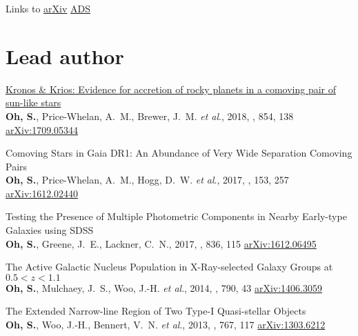 \documentclass[11pt,letterpaper]{article}
\newcommand*\arxiv[1]{\href{https://arxiv.org/abs/#1}{\small arXiv:#1}}
\newcommand{\etal}{\textit{et al}.}
\newcommand{\pubtitle}[1]{#1}
\newcommand{\doi}[2]{\pubtitle{\href{http://dx.doi.org/#1}{{#2}}}}
\newcommand{\submitted}[1]{submitted to #1}
\begin{document}
\noindent
Links to \href{https://arxiv.org/find/all/1/all:+AND+semyeong+oh/0/1/0/all/0/1}{arXiv}
\href{https://ui.adsabs.harvard.edu/public-libraries/Slk-d10nSAe9qtCnvfJd8w}{ADS}

\section*{\small Lead author}

\begin{etaremune}


  \item
    \doi{10.3847/1538-4357/aaab4d}{
      Kronos \& Krios: Evidence for accretion of rocky planets in a comoving pair of sun-like stars}\\
    {\bf {Oh}, S.}, {Price-Whelan}, A.~M., {Brewer}, J.~M. \etal,
    2018,
    \apj, 854, 138
    \arxiv{1709.05344}

  \item 
    \pubtitle{Comoving Stars in Gaia DR1: An Abundance of Very Wide Separation Comoving Pairs}\\
    {\bf {Oh}, S.}, {Price-Whelan}, A.~M., {Hogg}, D.~W. \etal,
    2017,
    \aj, 153, 257
    \arxiv{1612.02440}

  \item 
    \pubtitle{Testing the Presence of Multiple Photometric Components in Nearby Early-type Galaxies using SDSS}\\
    {{\bf {Oh}, S.}, {Greene}, J.~E., {Lackner}, C.~N.},
    2017,
    \apj, 836, 115
		\arxiv{1612.06495}

  \item 
    \pubtitle{The Active Galactic Nucleus Population in X-Ray-selected Galaxy Groups at $0.5 < z < 1.1$}\\
    {\bf {Oh}, S.}, {Mulchaey}, J.~S., {Woo}, J.-H. \etal,
    2014,
    \apj, 790, 43
		\arxiv{1406.3059}

  \item 
    \pubtitle{The Extended Narrow-line Region of Two Type-I Quasi-stellar Objects}\\
    {\bf {Oh}, S.}, {Woo}, J.-H., {Bennert}, V.~N. \etal,
    2013,
    \apj, 767, 117
    \arxiv{1303.6212}
\end{etaremune}
\end{document}
